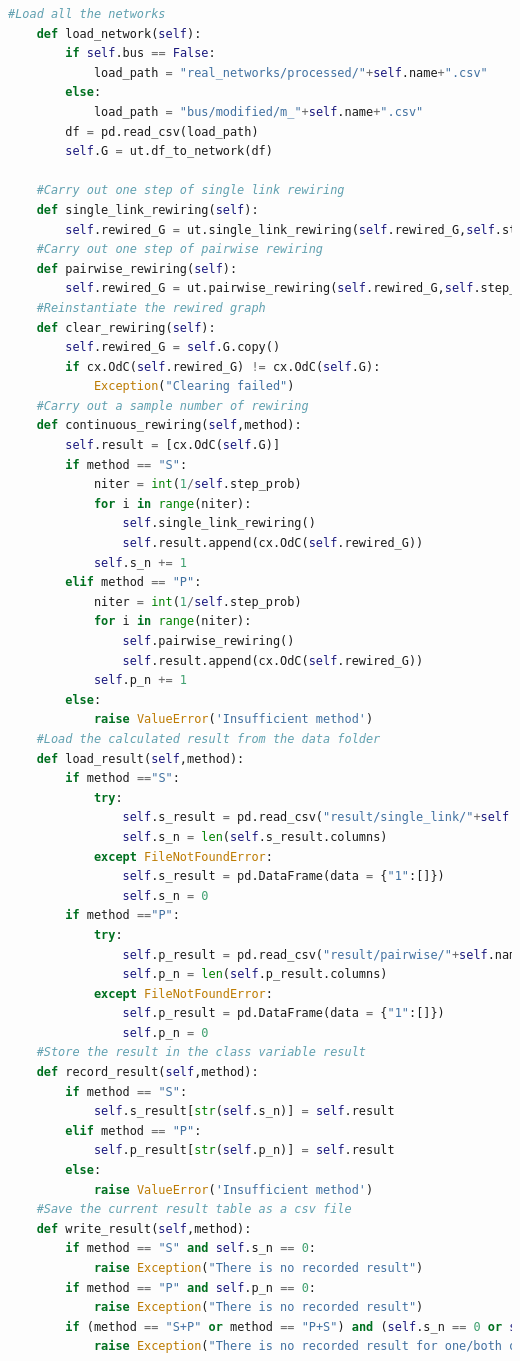 \documentclass[12pt]{article}
\begin{document}
{\begin{lstlisting}[breaklines=true,language=Python]
    #Load all the networks
    def load_network(self):
        if self.bus == False:
            load_path = "real_networks/processed/"+self.name+".csv"
        else:
            load_path = "bus/modified/m_"+self.name+".csv"
        df = pd.read_csv(load_path)
        self.G = ut.df_to_network(df)

    #Carry out one step of single link rewiring
    def single_link_rewiring(self):
        self.rewired_G = ut.single_link_rewiring(self.rewired_G,self.step_prob)
    #Carry out one step of pairwise rewiring
    def pairwise_rewiring(self):
        self.rewired_G = ut.pairwise_rewiring(self.rewired_G,self.step_prob)
    #Reinstantiate the rewired graph
    def clear_rewiring(self):
        self.rewired_G = self.G.copy()
        if cx.OdC(self.rewired_G) != cx.OdC(self.G):
            Exception("Clearing failed")
    #Carry out a sample number of rewiring
    def continuous_rewiring(self,method):
        self.result = [cx.OdC(self.G)]
        if method == "S":
            niter = int(1/self.step_prob)
            for i in range(niter):
                self.single_link_rewiring()
                self.result.append(cx.OdC(self.rewired_G))
            self.s_n += 1
        elif method == "P":
            niter = int(1/self.step_prob)
            for i in range(niter):
                self.pairwise_rewiring()
                self.result.append(cx.OdC(self.rewired_G))
            self.p_n += 1
        else:
            raise ValueError('Insufficient method')
    #Load the calculated result from the data folder
    def load_result(self,method):
        if method =="S":
            try:
                self.s_result = pd.read_csv("result/single_link/"+self.name+".csv")
                self.s_n = len(self.s_result.columns)
            except FileNotFoundError:
                self.s_result = pd.DataFrame(data = {"1":[]})
                self.s_n = 0
        if method =="P":
            try:
                self.p_result = pd.read_csv("result/pairwise/"+self.name+".csv")
                self.p_n = len(self.p_result.columns)
            except FileNotFoundError:
                self.p_result = pd.DataFrame(data = {"1":[]})
                self.p_n = 0
    #Store the result in the class variable result
    def record_result(self,method):
        if method == "S":
            self.s_result[str(self.s_n)] = self.result
        elif method == "P":
            self.p_result[str(self.p_n)] = self.result
        else:
            raise ValueError('Insufficient method')
    #Save the current result table as a csv file
    def write_result(self,method):
        if method == "S" and self.s_n == 0:
            raise Exception("There is no recorded result")
        if method == "P" and self.p_n == 0:
            raise Exception("There is no recorded result")
        if (method == "S+P" or method == "P+S") and (self.s_n == 0 or self.p_n==0):
            raise Exception("There is no recorded result for one/both of the methods.")
        

\end{lstlisting}}
\end{document}
